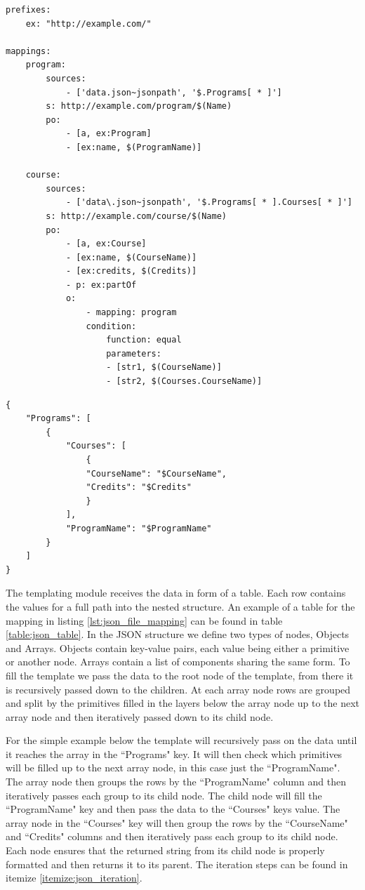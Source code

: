 \begin{lstlisting}[caption={Example YARRRML mapping for a JSON file}, label={lst:json_file_mapping}, captionpos=b, basicstyle=\small]
prefixes:
    ex: "http://example.com/"

mappings:
    program:
        sources:
            - ['data.json~jsonpath', '$.Programs[ * ]']
        s: http://example.com/program/$(Name)
        po:
            - [a, ex:Program]
            - [ex:name, $(ProgramName)]

    course:
        sources:
            - ['data\.json~jsonpath', '$.Programs[ * ].Courses[ * ]']
        s: http://example.com/course/$(Name)
        po:
            - [a, ex:Course]
            - [ex:name, $(CourseName)]
            - [ex:credits, $(Credits)]
            - p: ex:partOf
            o: 
                - mapping: program
                condition: 
                    function: equal
                    parameters:
                    - [str1, $(CourseName)]
                    - [str2, $(Courses.CourseName)]
\end{lstlisting}

\begin{lstlisting}[caption={Example JSON template}, label={lst:json_template}, captionpos=b, basicstyle=\small]
{
    "Programs": [
        {
            "Courses": [
                {
                "CourseName": "$CourseName",
                "Credits": "$Credits"
                }
            ],
            "ProgramName": "$ProgramName"
        }
    ]
}
\end{lstlisting}

The templating module receives the data in form of a table. Each row contains the values for a full path into the nested structure. An example of a table for the mapping in listing \ref{lst:json_file_mapping} can be found in table \ref{table:json_table}. In the JSON structure we define two types of nodes, Objects and Arrays. Objects contain key-value pairs, each value being either a primitive or another node. Arrays contain a list of components sharing the same form. To fill the template we pass the data to the root node of the template, from there it is recursively passed down to the children. At each array node rows are grouped and split by the primitives filled in the layers below the array node up to the next array node and then iteratively passed down to its child node.

For the simple example below the template will recursively pass on the data until it reaches the array in the ``Programs" key. It will then check which primitives will be filled up to the next array node, in this case just the ``ProgramName". The array node then groups the rows by the ``ProgramName" column and then iteratively passes each group to its child node. The child node will fill the ``ProgramName" key and then pass the data to the ``Courses" keys value. The array node in the ``Courses" key will then group the rows by the ``CourseName" and ``Credits" columns and then iteratively pass each group to its child node. Each node ensures that the returned string from its child node is properly formatted and then returns it to its parent. The iteration steps can be found in itemize \ref{itemize:json_iteration}.

